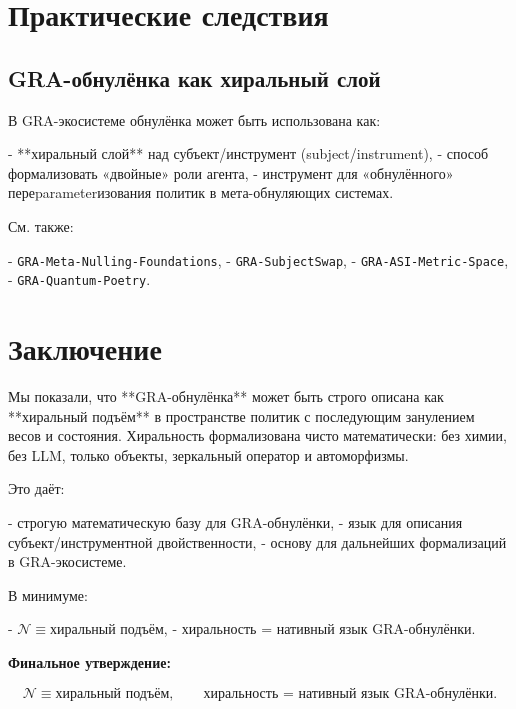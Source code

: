 \documentclass[11pt,a4paper]{article}
\begin{document}
\section{Практические следствия}

\subsection{GRA-обнулёнка как хиральный слой}

В GRA-экосистеме обнулёнка может быть использована как:

- **хиральный слой** над субъект/инструмент (subject/instrument),
- способ формализовать «двойные» роли агента,
- инструмент для «обнулённого» переparameterизования политик в мета-обнуляющих системах.

См. также:

- \texttt{GRA-Meta-Nulling-Foundations},
- \texttt{GRA-SubjectSwap},
- \texttt{GRA-ASI-Metric-Space},
- \texttt{GRA-Quantum-Poetry}.

\section{Заключение}

Мы показали, что **GRA-обнулёнка** может быть строго описана как **хиральный подъём** в пространстве политик с последующим занулением весов и состояния.
Хиральность формализована чисто математически: без химии, без LLM, только объекты, зеркальный оператор и автоморфизмы.

Это даёт:

- строгую математическую базу для GRA-обнулёнки,
- язык для описания субъект/инструментной двойственности,
- основу для дальнейших формализаций в GRA-экосистеме.

В минимуме:

- \(\mathcal{N} \equiv \text{хиральный подъём}\),
- хиральность = нативный язык GRA-обнулёнки.

\bigskip

\noindent
\textbf{Финальное утверждение:}

\[
\boxed{
\mathcal{N} \equiv \text{хиральный подъём}, \qquad
\text{хиральность = нативный язык GRA-обнулёнки}.
}
\]
\end{document}
